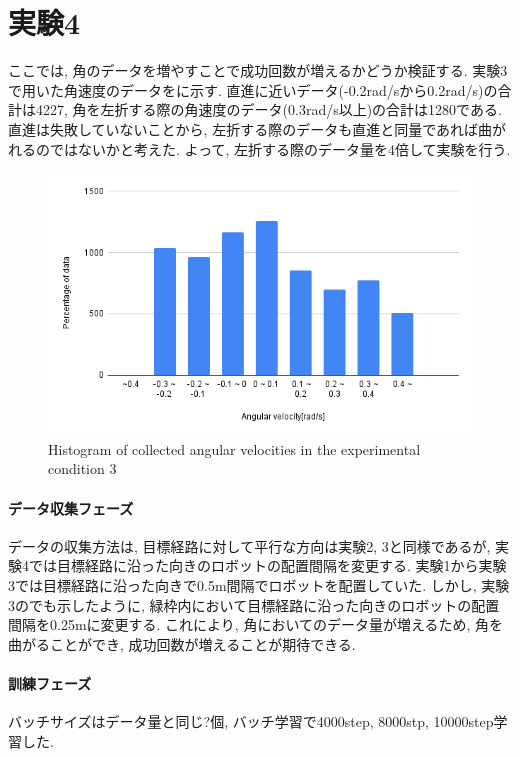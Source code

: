 \newpage

\section{実験4}
ここでは, 角のデータを増やすことで成功回数が増えるかどうか検証する. 実験3で用いた角速度のデータをに示す. 直進に近いデータ(-0.2rad/sから0.2rad/s)の合計は4227, 角を左折する際の角速度のデータ(0.3rad/s以上)の合計は1280である. 直進は失敗していないことから, 左折する際のデータも直進と同量であれば曲がれるのではないかと考えた. よって, 左折する際のデータ量を4倍して実験を行う. 

\begin{figure}[h]
  \centering
  \includegraphics[keepaspectratio, scale=0.4]{images/exp3.png}
  \caption{Histogram of collected angular velocities in the experimental condition 3}
  \label{Fig:exp3}
  \end{figure}

\paragraph{データ収集フェーズ}
データの収集方法は, 目標経路に対して平行な方向は実験2, 3と同様であるが, 実験4では目標経路に沿った向きのロボットの配置間隔を変更する. 実験1から実験3では目標経路に沿った向きで0.5m間隔でロボットを配置していた. しかし, 実験3のでも示したように, 緑枠内において目標経路に沿った向きのロボットの配置間隔を0.25mに変更する. これにより, 角においてのデータ量が増えるため, 角を曲がることができ, 成功回数が増えることが期待できる. 

\paragraph{訓練フェーズ}
バッチサイズはデータ量と同じ?個, バッチ学習で4000step, 8000stp, 10000step学習した. 

